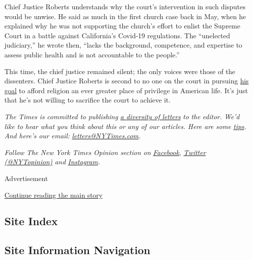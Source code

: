 Chief Justice Roberts understands why the court's intervention in such
disputes would be unwise. He said as much in the first church case back
in May, when he explained why he was not supporting the church's effort
to enlist the Supreme Court in a battle against California's Covid-19
regulations. The ``unelected judiciary,'' he wrote then, ``lacks the
background, competence, and expertise to assess public health and is not
accountable to the people.''

This time, the chief justice remained silent; the only voices were those
of the dissenters. Chief Justice Roberts is second to no one on the
court in pursuing
\href{https://www.nytimes3xbfgragh.onion/2020/07/16/opinion/supreme-court-roberts-religion.html?searchResultPosition=1}{his
goal} to afford religion an ever greater place of privilege in American
life. It's just that he's not willing to sacrifice the court to achieve
it.

\emph{The Times is committed to publishing}
\href{https://www.nytimes3xbfgragh.onion/2019/01/31/opinion/letters/letters-to-editor-new-york-times-women.html}{\emph{a
diversity of letters}} \emph{to the editor. We'd like to hear what you
think about this or any of our articles. Here are some}
\href{https://help.nytimes3xbfgragh.onion/hc/en-us/articles/115014925288-How-to-submit-a-letter-to-the-editor}{\emph{tips}}\emph{.
And here's our email:}
\href{mailto:letters@NYTimes.com}{\emph{letters@NYTimes.com}}\emph{.}

\emph{Follow The New York Times Opinion section on}
\href{https://www.facebookcorewwwi.onion/nytopinion}{\emph{Facebook}}\emph{,}
\href{http://twitter.com/NYTOpinion}{\emph{Twitter (@NYTopinion)}}
\emph{and}
\href{https://www.instagram.com/nytopinion/}{\emph{Instagram}}\emph{.}

Advertisement

\protect\hyperlink{after-bottom}{Continue reading the main story}

\hypertarget{site-index}{%
\subsection{Site Index}\label{site-index}}

\hypertarget{site-information-navigation}{%
\subsection{Site Information
Navigation}\label{site-information-navigation}}

